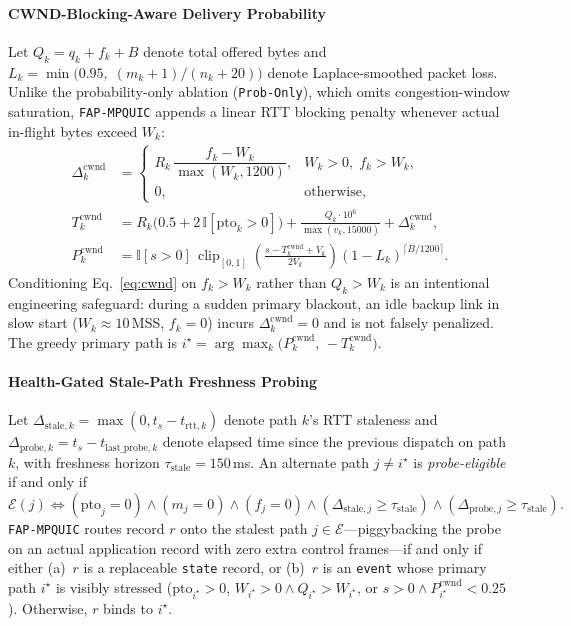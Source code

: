 \documentclass[preprint,12pt,number]{elsarticle}
\begin{document}
\paragraph{CWND-Blocking-Aware Delivery Probability}
Let $Q_k = q_k + f_k + B$ denote total offered bytes and $L_k = \min\!\big(0.95,\; (m_k + 1)/(n_k + 20)\big)$ denote Laplace-smoothed packet loss. Unlike the probability-only ablation (\texttt{Prob-Only}), which omits congestion-window saturation, \texttt{FAP-MPQUIC} appends a linear RTT blocking penalty whenever actual in-flight bytes exceed $W_k$:
\begin{align}
\Delta^{\text{cwnd}}_k &= \begin{cases} R_k\,\dfrac{f_k - W_k}{\max(W_k, 1200)}, & W_k > 0,\; f_k > W_k, \\ 0, & \text{otherwise}, \end{cases} \label{eq:cwnd}\\
T^{\text{cwnd}}_k &= R_k\big(0.5 + 2\,\mathbb{I}[\text{pto}_k > 0]\big) + \frac{Q_k \cdot 10^6}{\max(v_k, 15000)} + \Delta^{\text{cwnd}}_k, \label{eq:time}\\
P^{\text{cwnd}}_k &= \mathbb{I}[s > 0]\,\operatorname{clip}_{[0,1]}\!\left(\frac{s - T^{\text{cwnd}}_k + V_k}{2V_k}\right)(1 - L_k)^{\lceil B/1200\rceil}. \label{eq:prob}
\end{align}
Conditioning Eq.~\eqref{eq:cwnd} on $f_k > W_k$ rather than $Q_k > W_k$ is an intentional engineering safeguard: during a sudden primary blackout, an idle backup link in slow start ($W_k \approx 10$\,MSS, $f_k{=}0$) incurs $\Delta^{\text{cwnd}}_k = 0$ and is not falsely penalized. The greedy primary path is $i^\star = \arg\max_k \big(P^{\text{cwnd}}_k,\, -T^{\text{cwnd}}_k\big)$.

\paragraph{Health-Gated Stale-Path Freshness Probing}
Let $\Delta_{\text{stale},k} = \max(0, t_s - t_{\text{rtt},k})$ denote path $k$'s RTT staleness and $\Delta_{\text{probe},k} = t_s - t_{\text{last\_probe},k}$ denote elapsed time since the previous dispatch on path $k$, with freshness horizon $\tau_{\text{stale}} = 150$\,ms. An alternate path $j \ne i^\star$ is \emph{probe-eligible} if and only if
\begin{equation}
\label{eq:probe_gate}
\mathcal{E}(j) \iff (\text{pto}_j{=}0) \wedge (m_j{=}0) \wedge (f_j{=}0) \wedge (\Delta_{\text{stale},j} \ge \tau_{\text{stale}}) \wedge (\Delta_{\text{probe},j} \ge \tau_{\text{stale}}).
\end{equation}
\texttt{FAP-MPQUIC} routes record $r$ onto the stalest path $j \in \mathcal{E}$---piggybacking the probe on an actual application record with zero extra control frames---if and only if either (a)~$r$ is a replaceable \texttt{state} record, or (b)~$r$ is an \texttt{event} whose primary path $i^\star$ is visibly stressed ($\text{pto}_{i^\star} > 0$, $W_{i^\star} > 0 \wedge Q_{i^\star} > W_{i^\star}$, or $s > 0 \wedge P^{\text{cwnd}}_{i^\star} < 0.25$). Otherwise, $r$ binds to $i^\star$.
\end{document}
